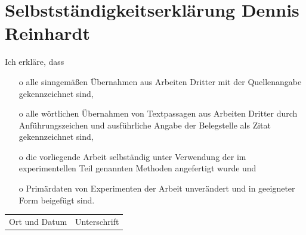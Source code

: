 \newpage
\section{Selbstständigkeitserklärung Dennis Reinhardt}
Ich erkläre, dass
\begin{itemize}
    \item[o] alle sinngemäßen Übernahmen aus Arbeiten Dritter mit der Quellenangabe gekennzeichnet sind,
    \item[o] alle wörtlichen Übernahmen von Textpassagen aus Arbeiten Dritter durch Anführungszeichen und ausführliche Angabe der Belegstelle als Zitat gekennzeichnet sind,
    \item[o] die vorliegende Arbeit selbständig unter Verwendung der im experimentellen Teil genannten Methoden angefertigt wurde und
    \item[o] Primärdaten von Experimenten der Arbeit unverändert und in geeigneter Form beigefügt sind.
\end{itemize}
\vspace*{0.5cm}
\begin{flushleft}
  \begin{table}[H]
      \begin{tabular}{l  l }
          \hline 
          Ort und Datum \hspace*{3cm}  & Unterschrift \hspace*{5cm}
      \end{tabular}    
  \end{table}
\end{flushleft}


\newpage